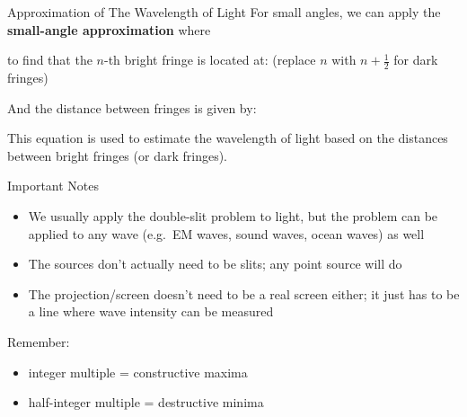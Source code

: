 \documentclass[compress,aspectratio=169]{beamer}
\newcommand{\eq}[2]{\vspace{#1}{\LARGE\begin{displaymath}#2\end{displaymath}}}
\begin{document}
\begin{frame}{Approximation of The Wavelength of Light}
  For small angles, we can apply the \textbf{small-angle approximation} where

  \eq{-.3in}{
    \theta\approx\tan\theta\approx\sin\theta
  }

  \vspace{-.15in}to find that the $n$-th bright fringe is located at:
  (replace $n$ with $n+\frac12$ for dark fringes)
  
  \eq{-.2in}{
    \boxed{y_n=n\frac{\lambda L}{d}}
  }

  And the distance between fringes is given by:

  \eq{-.2in}{
    \boxed{\Delta y=\frac{\lambda L}{d}}
  }

  This equation is used to estimate the wavelength of light based on
  the distances between bright fringes (or dark fringes).
\end{frame}



\begin{frame}{Important Notes}
  \begin{itemize}
  \item We usually apply the double-slit problem to light, but the problem can
    be applied to any wave (e.g.\ EM waves, sound waves, ocean waves) as well
  \item The sources don't actually need to be slits; any point source will do
  \item The projection/screen doesn't need to be a real screen either; it just
    has to be a line where wave intensity can be measured
  \end{itemize}

  \vspace{.25in}Remember:
  \begin{itemize}
  \item integer multiple = constructive maxima
  \item half-integer multiple = destructive minima
  \end{itemize}
\end{frame}
\end{document}
